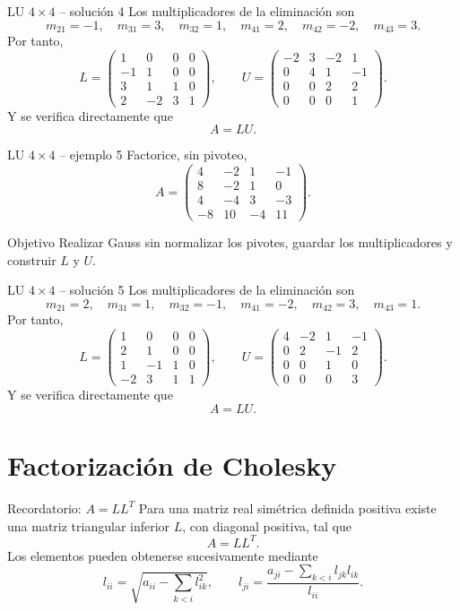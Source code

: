 \documentclass[aspectratio=169,10pt]{beamer}
\begin{document}
\begin{frame}{LU $4\times 4$ -- solución 4}
\small
Los multiplicadores de la eliminación son
\[
m_{21}=-1,\quad m_{31}=3,\quad m_{32}=1,\quad m_{41}=2,\quad m_{42}=-2,\quad m_{43}=3.
\]
Por tanto,
\[
L=\begin{pmatrix}1 & 0 & 0 & 0\\-1 & 1 & 0 & 0\\3 & 1 & 1 & 0\\2 & -2 & 3 & 1\end{pmatrix},\qquad U=\begin{pmatrix}-2 & 3 & -2 & 1\\0 & 4 & 1 & -1\\0 & 0 & 2 & 2\\0 & 0 & 0 & 1\end{pmatrix}.
\]
Y se verifica directamente que
\[
\boxed{A=LU}.
\]
\end{frame}
\begin{frame}{LU $4\times 4$ -- ejemplo 5}
\small
Factorice, sin pivoteo,
\[
A=\begin{pmatrix}4 & -2 & 1 & -1\\8 & -2 & 1 & 0\\4 & -4 & 3 & -3\\-8 & 10 & -4 & 11\end{pmatrix}.
\]
\begin{block}{Objetivo}
Realizar Gauss sin normalizar los pivotes, guardar los multiplicadores y construir $L$ y $U$.
\end{block}
\end{frame}
\begin{frame}{LU $4\times 4$ -- solución 5}
\small
Los multiplicadores de la eliminación son
\[
m_{21}=2,\quad m_{31}=1,\quad m_{32}=-1,\quad m_{41}=-2,\quad m_{42}=3,\quad m_{43}=1.
\]
Por tanto,
\[
L=\begin{pmatrix}1 & 0 & 0 & 0\\2 & 1 & 0 & 0\\1 & -1 & 1 & 0\\-2 & 3 & 1 & 1\end{pmatrix},\qquad U=\begin{pmatrix}4 & -2 & 1 & -1\\0 & 2 & -1 & 2\\0 & 0 & 1 & 0\\0 & 0 & 0 & 3\end{pmatrix}.
\]
Y se verifica directamente que
\[
\boxed{A=LU}.
\]
\end{frame}
\section{Factorización de Cholesky}
\begin{frame}{Recordatorio: $A=LL^T$}
\small
Para una matriz real simétrica definida positiva existe una matriz triangular inferior $L$, con diagonal positiva, tal que
\[
\boxed{A=LL^T}.
\]
Los elementos pueden obtenerse sucesivamente mediante
\[
l_{ii}=\sqrt{a_{ii}-\sum_{k<i}l_{ik}^2},\qquad
l_{ji}=\frac{a_{ji}-\sum_{k<i}l_{jk}l_{ik}}{l_{ii}}.
\]
\end{frame}
\end{document}
